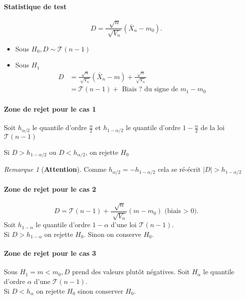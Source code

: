 \documentclass{article}
\theoremstyle{plain}%
\theoremstyle{definition}
\theoremstyle{remark}
\newtheorem*{rem}{Remarque}
\begin{document}
\paragraph*{Statistique de test}
\[
    D = \frac{\sqrt[]{n}}{\sqrt[]{V_n}}(\bar{X}_n - m_0)
.\]
\begin{itemize}
    \item Sous $ H_0, D \sim \mathcal{T}(n-1)$ 
    \item Sous $ H_1 $ \begin{align*}
        D &= \frac{\sqrt[]{n}}{\sqrt[]{V_n}} (\bar{X}_n - m) + \frac{\sqrt[]{n}}{\sqrt[]{V_n}} \\
            &= \mathcal{T}(n-1) + \text{ Biais ? du signe de } m_1 - m_0
    \end{align*}
\end{itemize}

\paragraph*{Zone de rejet pour le cas 1}
Soit $ h_{\alpha /2} $ le quantile d'ordre $ \frac{\alpha }{2} $ et $ h_{1-\alpha /2} $ le quantile d'ordre $ 1 - \frac{\alpha }{2} $ de la loi $ \mathcal{T}(n-1) $ 

Si $ D > h_{1 - \alpha /2} $ ou $ D < h_{\alpha /2} $, on rejette $ H_0 $ 
\begin{rem}[\textbf{Attention}]
    Comme $ h_{\alpha /2} = - h_{1-\alpha /2} $ cela se ré-écrit $ \left| D \right| > h_{1 - \alpha /2} $ 
\end{rem}

\paragraph*{Zone de rejet pour le cas 2}
\[
    D = \mathcal{T}(n-1) + \frac{\sqrt[]{n}}{\sqrt[]{V_n}}(m-m_0) \text{ (biais > 0)}
.\]
Soit $ h_{1 - \alpha } $ le quantile d'ordre $ 1 - \alpha  $ d'une loi $ \mathcal{T}(n-1)$. \\
Si $ D > h_{1-\alpha } $ on rejette $ H_0 $. Sinon on conserve $ H_0 $. 

\paragraph*{Zone de rejet pour le cas 3}
Sous $ H_1 = m < m_0, D $ prend des valeurs plutôt négatives. Soit $ H_\alpha  $ le quantile d'ordre $ \alpha  $ d'une $ \mathcal{T}(n-1) $. \\
Si $ D < h_\alpha $ on rejette $ H_0 $ sinon conserver $ H_0 $. 
\end{document}
